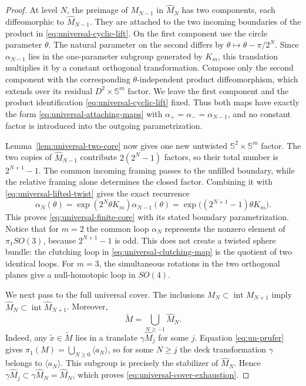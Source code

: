 \documentclass[11pt,reqno]{amsart}
\theoremstyle{definition}
\numberwithin{equation}{section}
\begin{document}
\begin{proof}
At level \(N\), the preimage of \(M_{N-1}\) in
\(\widehat M_N\) has two components, each diffeomorphic to
\(\widehat M_{N-1}\).  They are attached to the two incoming
boundaries of the product in \eqref{eq:universal-cyclic-lift}.  On the
first component use the circle parameter \(\theta\).  The natural
parameter on the second differs by
\(\theta\mapsto\theta-\pi/2^N\).  Since \(\alpha_{N-1}\) lies in the
one-parameter subgroup generated by \(K_m\), this translation multiplies
it by a constant orthogonal transformation.  Compose only the second
component with the corresponding \(\theta\)-independent product
diffeomorphism, which extends over its residual
\(D^2\times\mathbb S^m\) factor.  We leave the first component and the
product identification \eqref{eq:universal-cyclic-lift} fixed.  Thus
both maps have exactly the form \eqref{eq:universal-attaching-maps} with
\(\alpha_+=\alpha_-=\alpha_{N-1}\), and no constant factor is introduced
into the outgoing parametrization.

Lemma~\ref{lem:universal-two-core} now gives one new untwisted
\(\mathbb S^2\times\mathbb S^m\) factor.  The two copies of
\(\widehat M_{N-1}\) contribute \(2(2^N-1)\) factors, so their total
number is \(2^{N+1}-1\).  The common incoming framing passes to the
unfilled boundary, while the relative framing alone determines the
closed factor.  Combining it with \eqref{eq:universal-lifted-twist}
gives the exact recurrence
\begin{equation}\label{eq:universal-framing-recurrence}
 \alpha_N(\theta)
 =\exp(2^N\theta K_m)\alpha_{N-1}(\theta)
 =\exp\bigl((2^{N+1}-1)\theta K_m\bigr).
\end{equation}
This proves \eqref{eq:universal-finite-core} with its stated boundary
parametrization.  Notice that for \(m=2\) the common loop
\(\alpha_N\) represents the nonzero element of \(\pi_1SO(3)\), because
\(2^{N+1}-1\) is odd.  This does not create a twisted sphere bundle:
the clutching loop in \eqref{eq:universal-clutching-map} is the quotient
of two identical loops.  For \(m=3\), the simultaneous rotations in the
two orthogonal planes give a null-homotopic loop in \(SO(4)\).

We next pass to the full universal cover.  The inclusions
\(M_N\subset\operatorname{int}M_{N+1}\) imply
\(\widehat M_N\subset\operatorname{int}\widehat M_{N+1}\).  Moreover,
\begin{equation}\label{eq:universal-cover-exhaustion}
 \widetilde M=\bigcup_{N\ge-1}\widehat M_N.
\end{equation}
Indeed, any \(\widetilde x\in\widetilde M\) lies in a translate
\(\gamma\widehat M_j\) for some \(j\).  Equation
\eqref{eq:un-prufer} gives
\(\pi_1(M)=\bigcup_{N\ge0}\langle a_N\rangle\), so for some
\(N\ge j\) the deck transformation \(\gamma\) belongs to
\(\langle a_N\rangle\).  This subgroup is precisely the stabilizer of
\(\widehat M_N\).  Hence
\(\gamma\widehat M_j\subset\gamma\widehat M_N=\widehat M_N\), which
proves \eqref{eq:universal-cover-exhaustion}.


\end{proof}
\end{document}
